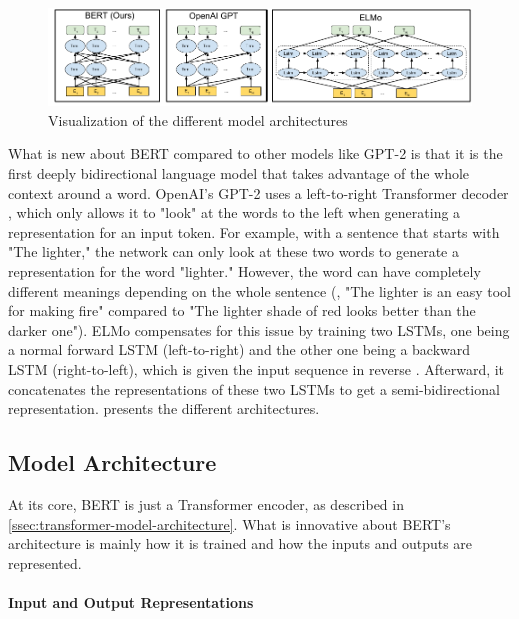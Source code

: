 \begin{figure}[h]
\centering
\includegraphics[width=0.7\paperwidth]{figures/bert-gpt2-elmo-model-comparison}
\caption[Visualization of the different model architectures]{Visualization of the different model architectures \cite[p.~13]{devlin2018bert}}
\label{fig:bert-gpt2-elmo-model-comparison}
\end{figure}

What is new about BERT compared to other models like GPT-2 is that it is the first deeply bidirectional language model that takes advantage of the whole context around a word.
OpenAI's GPT-2 uses a left-to-right Transformer decoder \cite[p.~4]{radford2019language}, which only allows it to "look" at the words to the left when generating a representation for an input token.
For example, with a sentence that starts with "The lighter," the network can only look at these two words to generate a representation for the word "lighter."
However, the word can have completely different meanings depending on the whole sentence (\eg, "The lighter is an easy tool for making fire" compared to "The lighter shade of red looks better than the darker one"). 
ELMo compensates for this issue by training two LSTMs, one being a normal forward LSTM (left-to-right) and the other one being a backward LSTM (right-to-left), which is given the input sequence in reverse \cite[p.~2--3]{1802.05365}.
Afterward, it concatenates the representations of these two LSTMs to get a semi-bidirectional representation.
 presents the different architectures.

\subsection{Model Architecture}

At its core, BERT is just a Transformer encoder, as described in \cref{ssec:transformer-model-architecture}.
What is innovative about BERT's architecture is mainly how it is trained and how the inputs and outputs are represented.

\paragraph{Input and Output Representations}

